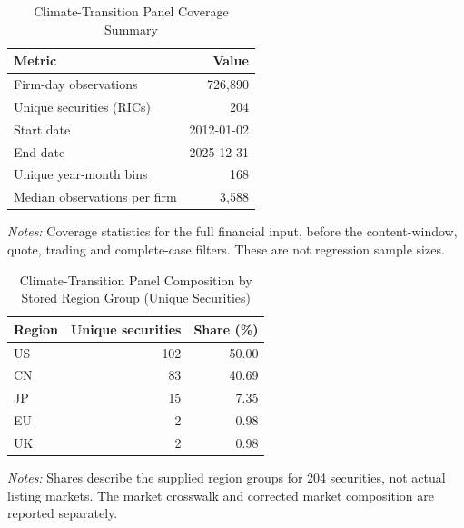 \documentclass{article}
\theoremstyle{plain}
\begin{document}
\begin{table}[htbp]
\centering
\caption{Climate-Transition Panel Coverage Summary}
\label{tab:energy_desc_coverage}
\begin{threeparttable}
\small
\begin{tabular}{l r}
\toprule
Metric & Value \\
\midrule
Firm-day observations & 726,890 \\
Unique securities (RICs) & 204 \\
Start date & 2012-01-02 \\
End date & 2025-12-31 \\
Unique year-month bins & 168 \\
Median observations per firm & 3,588 \\
\bottomrule
\end{tabular}
\begin{tablenotes}\small
\item \textit{Notes:} Coverage statistics for the full financial input, before the content-window, quote, trading and complete-case filters. These are not regression sample sizes.
\end{tablenotes}
\end{threeparttable}
\end{table}

\begin{table}[htbp]
\centering
\caption{Climate-Transition Panel Composition by Stored Region Group (Unique Securities)}
\label{tab:energy_desc_region}
\begin{threeparttable}
\small
\begin{tabular}{l r r}
\toprule
Region & Unique securities & Share (\%) \\
\midrule
US & 102 & 50.00 \\
CN & 83 & 40.69 \\
JP & 15 & 7.35 \\
EU & 2 & 0.98 \\
UK & 2 & 0.98 \\
\bottomrule
\end{tabular}
\begin{tablenotes}\small
\item \textit{Notes:} Shares describe the supplied region groups for 204 securities, not actual listing markets. The market crosswalk and corrected market composition are reported separately.
\end{tablenotes}
\end{threeparttable}
\end{table}
\end{document}
